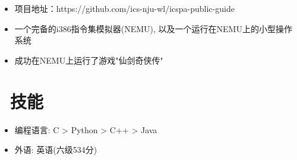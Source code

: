 \documentclass{resume}
\begin{document}
\vspace{0.5ex}

\begin{itemize}[parsep=0.5ex,topsep=0pt]
  \item 项目地址：https://github.com/ics-nju-wl/icspa-public-guide
  \item 一个完备的i386指令集模拟器(NEMU), 以及一个运行在NEMU上的小型操作系统
  \item 成功在NEMU上运行了游戏"仙剑奇侠传"
\end{itemize}




\section{\faCogs\ 技能}
\begin{itemize}[parsep=0.5ex]
  \item 编程语言: C > Python > C++ > Java
  \item 外语: 英语(六级534分)
\end{itemize}


%
%
\end{document}
